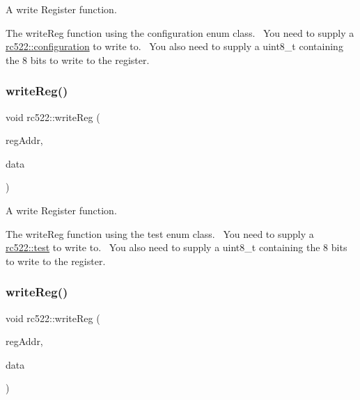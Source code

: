 A write Register function. 

The write\+Reg function using the configuration enum class.~\newline
You need to supply a \hyperlink{classrc522_afcf27c8198d017cd4e8173c7d7a6fded}{rc522\+::configuration} to write to.~\newline
You also need to supply a uint8\+\_\+t containing the 8 bits to write to the register.~\newline
 \mbox{\label{classrc522_a6907bf656f821a89e636a1b8cf28fe60}} 
\subsubsection{\texorpdfstring{write\+Reg()}{writeReg()}\hspace{0.1cm}{\footnotesize\ttfamily [4/6]}}
{\footnotesize\ttfamily void rc522\+::write\+Reg (\begin{DoxyParamCaption}\item[{\hyperlink{classrc522_a9589917c9bbcd18ea9c7d86c7ec565bd}{rc522\+::test}}]{reg\+Addr,  }\item[{uint8\+\_\+t}]{data }\end{DoxyParamCaption})}



A write Register function. 

The write\+Reg function using the test enum class.~\newline
You need to supply a \hyperlink{classrc522_a9589917c9bbcd18ea9c7d86c7ec565bd}{rc522\+::test} to write to.~\newline
You also need to supply a uint8\+\_\+t containing the 8 bits to write to the register.~\newline
 \mbox{\label{classrc522_a458e303b33f57ed839c21e790f912191}} 
\subsubsection{\texorpdfstring{write\+Reg()}{writeReg()}\hspace{0.1cm}{\footnotesize\ttfamily [5/6]}}
{\footnotesize\ttfamily void rc522\+::write\+Reg (\begin{DoxyParamCaption}\item[{\hyperlink{classrc522_a83057db5f8fefa3dc9a6e8e5f0e191ee}{rc522\+::registers}}]{reg\+Addr,  }\item[{\hyperlink{classrc522_a3a205976fb9b7265bc5b7971215fbb7c}{rc522\+::reg\+Commands}}]{data }\end{DoxyParamCaption})}



